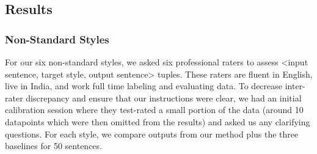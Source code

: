 



\subsection{Results}
\subsubsection{Non-Standard Styles}
For our six non-standard styles, we asked six professional raters to assess  <input sentence, target style, output sentence> tuples. These raters are fluent in English, live in India, and work full time labeling and evaluating data. To decrease inter-rater discrepancy and ensure that our instructions were clear, we had an initial calibration session where they test-rated a small portion of the data (around 10 datapoints which were then omitted from the results) and asked us any clarifying questions. For each style, we compare outputs from our method plus the three baselines for 50 sentences.


